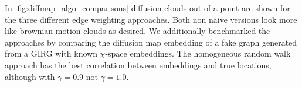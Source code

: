 




In \cref{fig:diffmap_algo_comparisons} diffusion clouds out of a point are shown for the three different edge weighting approaches. Both non naive versions look more like brownian motion clouds as desired. We additionally benchmarked the approaches by comparing the diffusion map embedding of a fake graph generated from a GIRG with known $\chi$-space embeddings. The homogeneous random walk approach has the best correlation between embeddings and true locations, although with $\gamma=0.9$ not $\gamma=1.0$.



